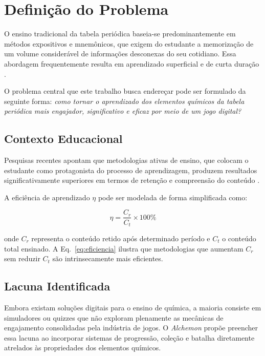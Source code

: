 
\section{Definição do Problema}

O ensino tradicional da tabela periódica baseia-se predominantemente em métodos
expositivos e mnemônicos, que exigem do estudante a memorização de um volume
considerável de informações desconexas do seu cotidiano. Essa abordagem frequentemente
resulta em aprendizado superficial e de curta duração \cite{gee2003videogames}.

O problema central que este trabalho busca endereçar pode ser formulado da
seguinte forma: \textit{como tornar o aprendizado dos elementos químicos da
tabela periódica mais engajador, significativo e eficaz por meio de um jogo
digital?}


\subsection{Contexto Educacional}

Pesquisas recentes apontam que metodologias ativas de ensino, que colocam o
estudante como protagonista do processo de aprendizagem, produzem resultados
significativamente superiores em termos de retenção e compreensão do conteúdo
\cite{mayer2019serious}.

A eficiência de aprendizado $\eta$ pode ser modelada de forma simplificada como:

\begin{equation}
    \eta = \frac{C_r}{C_t} \times 100\%
    \label{eq:eficiencia}
\end{equation}

\noindent onde $C_r$ representa o conteúdo retido após determinado período e
$C_t$ o conteúdo total ensinado. A Eq.~\eqref{eq:eficiencia} ilustra que
metodologias que aumentam $C_r$ sem reduzir $C_t$ são intrinsecamente mais
eficientes.

\subsection{Lacuna Identificada}

Embora existam soluções digitais para o ensino de química, a maioria consiste
em simuladores ou quizzes que não exploram plenamente as mecânicas de engajamento
consolidadas pela indústria de jogos. O \textit{Alchemon} propõe preencher essa
lacuna ao incorporar sistemas de progressão, coleção e batalha diretamente
atrelados às propriedades dos elementos químicos.

